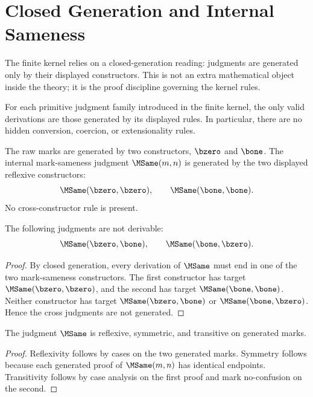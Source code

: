 
\chapter{Closed Generation and Internal Sameness}
\label{ch:proof-standing-internal-sameness-no-confusion}

The finite kernel relies on a closed-generation reading: judgments are generated only by their displayed constructors. This is not an extra mathematical object inside the theory; it is the proof discipline governing the kernel rules.

\begin{principle}
For each primitive judgment family introduced in the finite kernel, the only valid derivations are those generated by its displayed rules. In particular, there are no hidden conversion, coercion, or extensionality rules.
\end{principle}

\begin{definition}
The raw marks are generated by two constructors, \(\bzero\) and \(\bone\). The internal mark-sameness judgment \(\MSame(m,n)\) is generated by the two displayed reflexive constructors:
$$
\MSame(\bzero,\bzero),\qquad \MSame(\bone,\bone).
$$
No cross-constructor rule is present.
\end{definition}

\begin{theorem}
The following judgments are not derivable:
$$
\MSame(\bzero,\bone),\qquad \MSame(\bone,\bzero).
$$
\end{theorem}
\begin{proof}
By closed generation, every derivation of \(\MSame\) must end in one of the two mark-sameness constructors. The first constructor has target \(\MSame(\bzero,\bzero)\), and the second has target \(\MSame(\bone,\bone)\). Neither constructor has target \(\MSame(\bzero,\bone)\) or \(\MSame(\bone,\bzero)\). Hence the cross judgments are not generated.
\end{proof}

\begin{theorem}
The judgment \(\MSame\) is reflexive, symmetric, and transitive on generated marks.
\end{theorem}
\begin{proof}
Reflexivity follows by cases on the two generated marks. Symmetry follows because each generated proof of \(\MSame(m,n)\) has identical endpoints. Transitivity follows by case analysis on the first proof and mark no-confusion on the second.
\end{proof}

